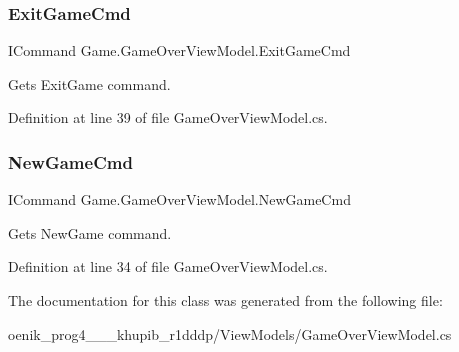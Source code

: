 \subsubsection{\texorpdfstring{ExitGameCmd}{ExitGameCmd}}
{\footnotesize\ttfamily I\+Command Game.\+Game\+Over\+View\+Model.\+Exit\+Game\+Cmd\hspace{0.3cm}{\ttfamily [get]}}



Gets Exit\+Game command. 



Definition at line 39 of file Game\+Over\+View\+Model.\+cs.

\mbox{\label{class_game_1_1_game_over_view_model_a01f8af5bc33f89150c7bbcda1370b41f}} 
\subsubsection{\texorpdfstring{NewGameCmd}{NewGameCmd}}
{\footnotesize\ttfamily I\+Command Game.\+Game\+Over\+View\+Model.\+New\+Game\+Cmd\hspace{0.3cm}{\ttfamily [get]}}



Gets New\+Game command. 



Definition at line 34 of file Game\+Over\+View\+Model.\+cs.



The documentation for this class was generated from the following file\+:\begin{DoxyCompactItemize}
\item 
oenik\+\_\+prog4\+\_\+\_\+\_\+khupib\+\_\+r1dddp/\+View\+Models/Game\+Over\+View\+Model.\+cs\end{DoxyCompactItemize}
